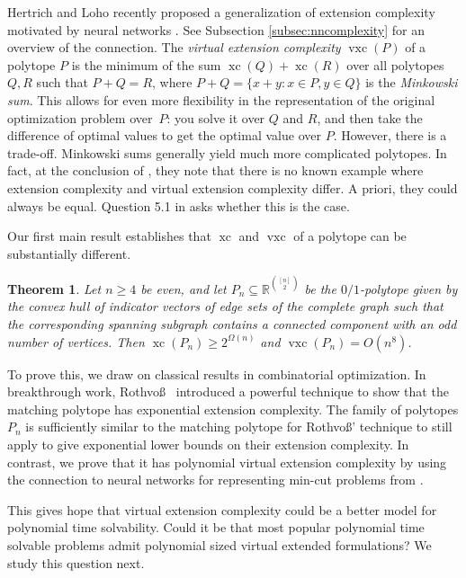 \documentclass[centering,11pt,reqno]{amsart}
\newtheorem{theorem}{Theorem}[section]
\theoremstyle{definition}
\DeclareMathOperator{\xc}{xc}
\DeclareMathOperator{\vxc}{vxc}
\newcommand{\defn}[1]{\emph{#1}}
\begin{document}
Hertrich and Loho recently proposed a generalization of extension complexity motivated by neural networks \cite{VirtualExtensions}.  See Subsection \ref{subsec:nncomplexity} for an overview of the connection. The \defn{virtual extension complexity} $\vxc(P)$ of a polytope $P$ is the minimum of the sum $\xc(Q) + \xc(R)$ over all polytopes $Q, R$ such that $P + Q = R$, where $P + Q = \{x + y: x \in P, y \in Q\}$ is the \emph{Minkowski sum}. 
This allows for even more flexibility in the representation of the original optimization problem over~$P$: you solve it over $Q$ and $R$, and then take the difference of optimal values to get the optimal value over $P$. However, there is a trade-off. Minkowski sums generally yield much more complicated polytopes. In fact, at the conclusion of \cite{VirtualExtensions}, they note that there is no known example where extension complexity and virtual extension complexity differ. A priori, they could always be equal. Question 5.1 in \cite{VirtualExtensions} asks whether this is the case.



Our first main result establishes that $\xc$ and $\vxc$ of a polytope can be substantially different.

\begin{theorem}\label{thm:exponential-separation}
Let $n\ge4$ be even, and let $P_{n} \subseteq \mathbb{R}^{\binom{[n]}{2}}$ be the $0/1$-polytope given by the convex hull of indicator vectors of edge sets of the complete graph such that the corresponding spanning subgraph contains a connected component with an odd number of vertices. Then $\xc(P_{n}) \ge 2^{\Omega(n)}$ and $\vxc(P_{n}) = O(n^{8})$.
\end{theorem}

To prove this, we draw on classical results in combinatorial optimization. In breakthrough work, Rothvo\ss{}~\cite{MatchingExtensions} introduced a powerful technique to show that the matching polytope has exponential extension complexity.
The family of polytopes $P_n$ is sufficiently similar to the matching polytope for Rothvo\ss{}' technique to still apply to give exponential lower bounds on their extension complexity. In contrast, we prove that it has polynomial virtual extension complexity by using the connection to neural networks for representing min-cut problems from   \cite{hertrich2025relu}.  




This gives hope that virtual extension complexity could be a better model for polynomial time solvability. Could it be that most popular polynomial time solvable problems admit polynomial sized virtual extended formulations? We study this question next.
\end{document}

